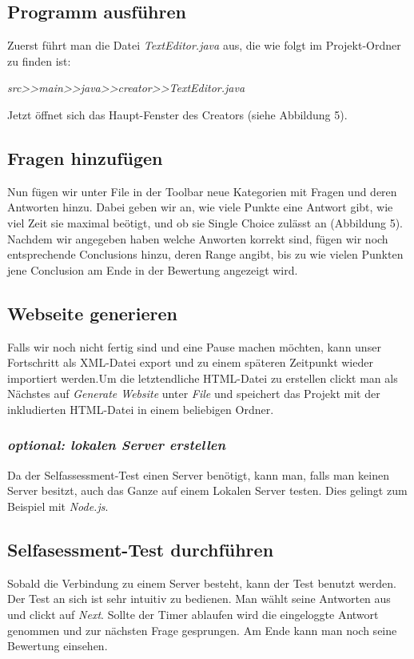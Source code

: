 \subsection{Programm ausführen}
Zuerst führt man die Datei \textit{TextEditor.java} aus, die wie folgt im Projekt-Ordner zu finden ist:\newline 

\textit{src>>main>>java>>creator>>TextEditor.java}\newline 

Jetzt öffnet sich das Haupt-Fenster des Creators (siehe Abbildung 5).
\subsection{Fragen hinzufügen}
Nun fügen wir unter File in der Toolbar neue Kategorien mit Fragen und deren Antworten hinzu. Dabei geben wir an, wie viele Punkte eine Antwort gibt, wie viel Zeit sie maximal beötigt, und ob sie Single Choice zulässt an (Abbildung 5). Nachdem wir angegeben haben welche Anworten korrekt sind, fügen wir noch entsprechende Conclusions hinzu, deren Range angibt, bis zu wie vielen Punkten jene Conclusion am Ende in der Bewertung angezeigt wird. 
\subsection{Webseite generieren}
Falls wir noch nicht fertig sind und eine Pause machen möchten, kann unser Fortschritt als XML-Datei export und zu einem späteren Zeitpunkt wieder importiert werden.\newline Um die letztendliche HTML-Datei zu erstellen clickt man als Nächstes auf \textit{Generate Website} unter \textit{File} und speichert das Projekt mit der inkludierten HTML-Datei in einem beliebigen Ordner.
\subsubsection*{\textit{optional: lokalen Server erstellen}}
Da der Selfassessment-Test einen Server benötigt, kann man, falls man keinen Server besitzt, auch das Ganze auf einem Lokalen Server testen. Dies gelingt zum Beispiel mit \textit{Node.js}.
\subsection{Selfasessment-Test durchführen}
Sobald die Verbindung zu einem Server besteht, kann der Test benutzt werden. Der Test an sich ist sehr intuitiv zu bedienen. Man wählt seine Antworten aus und clickt auf \textit{Next}. Sollte der Timer ablaufen wird die eingeloggte Antwort genommen und zur nächsten Frage gesprungen. Am Ende kann man noch seine Bewertung einsehen.